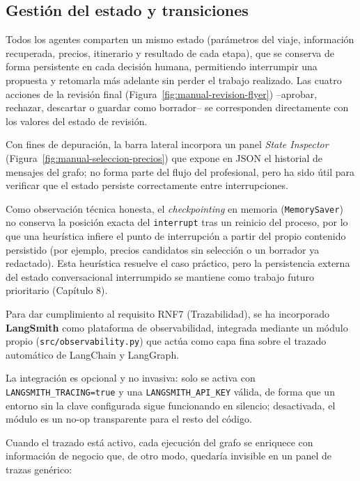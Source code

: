 \subsection{Gestión del estado y transiciones}
Todos los agentes comparten un mismo estado (parámetros del viaje, información recuperada, precios, itinerario y resultado de cada etapa), que se conserva de forma persistente en cada decisión humana, permitiendo interrumpir una propuesta y retomarla más adelante sin perder el trabajo realizado. Las cuatro acciones de la revisión final (Figura~\ref{fig:manual-revision-flyer}) --aprobar, rechazar, descartar o guardar como borrador-- se corresponden directamente con los valores del estado de revisión.

Con fines de depuración, la barra lateral incorpora un panel \textit{State Inspector} (Figura~\ref{fig:manual-seleccion-precios}) que expone en JSON el historial de mensajes del grafo; no forma parte del flujo del profesional, pero ha sido útil para verificar que el estado persiste correctamente entre interrupciones.

Como observación técnica honesta, el \textit{checkpointing} en memoria (\texttt{MemorySaver}) no conserva la posición exacta del \texttt{interrupt} tras un reinicio del proceso, por lo que una heurística infiere el punto de interrupción a partir del propio contenido persistido (por ejemplo, precios candidatos sin selección o un borrador ya redactado). Esta heurística resuelve el caso práctico, pero la persistencia externa del estado conversacional interrumpido se mantiene como trabajo futuro prioritario (Capítulo 8).

Para dar cumplimiento al requisito RNF7 (Trazabilidad), se ha incorporado \textbf{LangSmith} como plataforma de observabilidad, integrada mediante un módulo propio (\texttt{src/observability.py}) que actúa como capa fina sobre el trazado automático de LangChain y LangGraph.

La integración es opcional y no invasiva: solo se activa con \texttt{LANGSMITH\_TRACING=true} y una \texttt{LANGSMITH\_API\_KEY} válida, de forma que un entorno sin la clave configurada sigue funcionando en silencio; desactivada, el módulo es un no-op transparente para el resto del código.

Cuando el trazado está activo, cada ejecución del grafo se enriquece con información de negocio que, de otro modo, quedaría invisible en un panel de trazas genérico:

